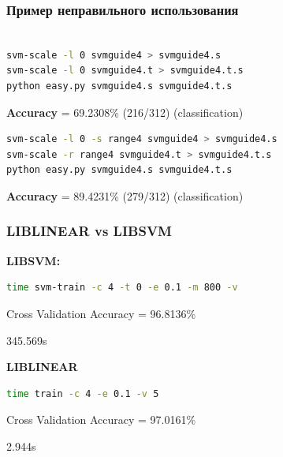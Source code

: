 \begin{frame}[fragile]
\frametitle{Пример неправильного использования}

\begin{lstlisting}[language=bash]

svm-scale -l 0 svmguide4 > svmguide4.s
svm-scale -l 0 svmguide4.t > svmguide4.t.s
python easy.py svmguide4.s svmguide4.t.s
\end{lstlisting}
\textbf{Accuracy} = 69.2308\% (216/312) (classification)

\begin{lstlisting}[language=bash]
svm-scale -l 0 -s range4 svmguide4 > svmguide4.s
svm-scale -r range4 svmguide4.t > svmguide4.t.s
python easy.py svmguide4.s svmguide4.t.s
\end{lstlisting}
\textbf{Accuracy} = 89.4231\% (279/312) (classification)

\end{frame}



\begin{frame}[fragile]
\frametitle{LIBLINEAR vs LIBSVM}
	
	\textbf{LIBSVM:}
	\begin{lstlisting}[language=bash]
	time svm-train -c 4 -t 0 -e 0.1 -m 800 -v
	\end{lstlisting}
	Cross Validation Accuracy = 96.8136\%

	345.569s

	\textbf{LIBLINEAR}
	\begin{lstlisting}[language=bash]
	time train -c 4 -e 0.1 -v 5
	\end{lstlisting}

	Cross Validation Accuracy = 97.0161\%

	2.944s

\end{frame}